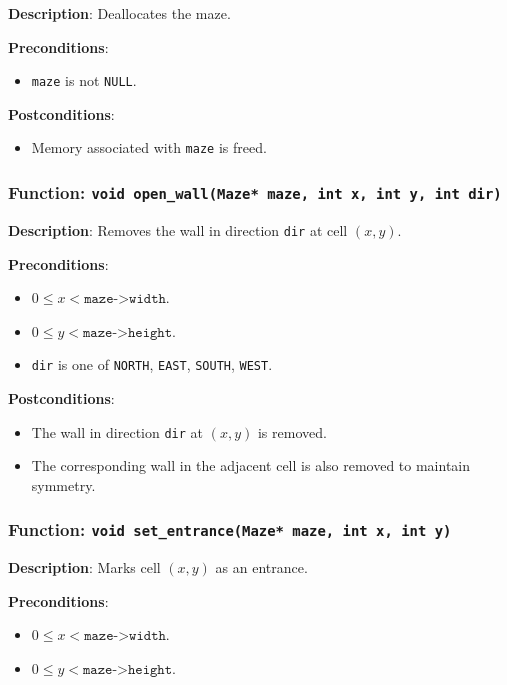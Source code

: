 \documentclass{article}
\begin{document}
\textbf{Description}: Deallocates the maze.

\textbf{Preconditions}:
\begin{itemize}[noitemsep]
    \item \texttt{maze} is not \texttt{NULL}.
\end{itemize}

\textbf{Postconditions}:
\begin{itemize}[noitemsep]
    \item Memory associated with \texttt{maze} is freed.
\end{itemize}

\subsubsection*{Function: \texttt{void open\_wall(Maze* maze, int x, int y, int dir)}}

\textbf{Description}: Removes the wall in direction \texttt{dir} at cell $(x, y)$.

\textbf{Preconditions}:
\begin{itemize}[noitemsep]
    \item $0 \leq x < \texttt{maze->width}$.
    \item $0 \leq y < \texttt{maze->height}$.
    \item \texttt{dir} is one of \texttt{NORTH}, \texttt{EAST}, \texttt{SOUTH}, \texttt{WEST}.
\end{itemize}

\textbf{Postconditions}:
\begin{itemize}[noitemsep]
    \item The wall in direction \texttt{dir} at $(x, y)$ is removed.
    \item The corresponding wall in the adjacent cell is also removed to maintain symmetry.
\end{itemize}

\subsubsection*{Function: \texttt{void set\_entrance(Maze* maze, int x, int y)}}

\textbf{Description}: Marks cell $(x, y)$ as an entrance.

\textbf{Preconditions}:
\begin{itemize}[noitemsep]
    \item $0 \leq x < \texttt{maze->width}$.
    \item $0 \leq y < \texttt{maze->height}$.
\end{itemize}
\end{document}
